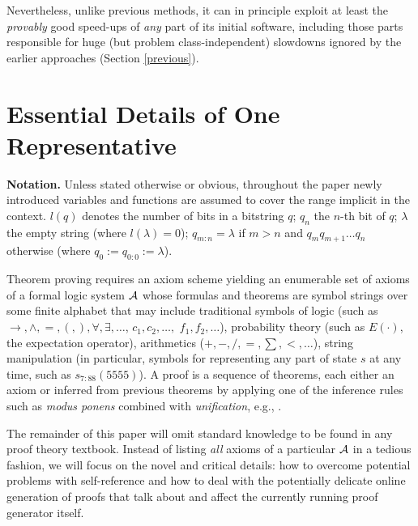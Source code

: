 Nevertheless, unlike previous methods, it can 
in principle exploit at least the {\em provably} good speed-ups 
of {\em any} part of its initial software, including those 
parts responsible for huge (but problem class-independent) slowdowns 
ignored by the earlier approaches \cite{Hutter:01aixi+,Hutter:01fast+}
(Section \ref{previous}).

\section{Essential Details of One Representative \GM}
\label{details}
{\bf Notation.} Unless stated otherwise or obvious, 
throughout the paper newly introduced variables and functions
are assumed to cover the range implicit in the context.
$l(q)$ denotes the number of bits in a bitstring $q$; 
$q_n$ the $n$-th bit of $q$;
$\lambda$ the empty string (where $l(\lambda)=0$);
$q_{m:n}= \lambda$ if $m>n$ and $q_m q_{m+1} \ldots q_n$
otherwise (where $q_0 := q_{0:0} := \lambda$).

Theorem proving requires an 
axiom scheme yielding an 
enumerable set of 
axioms of a formal logic 
system $\cal A$ whose formulas and theorems are symbol 
strings over some finite alphabet that may include traditional
symbols of logic (such as
$\rightarrow,\wedge,=,(,), \forall, \exists, \ldots$,
$c_1, c_2, \ldots,$  $f_1, f_2, \ldots$), 
probability theory (such as $E(\cdot)$, the expectation operator),
arithmetics ($+, -, /, = , \sum, <, \ldots$),
string manipulation (in particular, symbols for 
representing any part of state $s$ at any time, 
such as $s_{7:88}(5555)$).
A proof is a sequence of theorems,
each either an axiom or inferred from previous
theorems by applying one of the inference rules such
as {\em modus ponens} combined with {\em unification}, e.g.,
\cite{Fitting:96}.  

The remainder of this paper will omit standard knowledge to be found 
in any proof theory textbook.
Instead of listing {\em all} axioms of a particular $\cal A$ in
a tedious fashion,
we will focus on the novel and critical details: 
how to overcome potential problems with self-reference 
and how to deal with the potentially delicate online generation of proofs 
that talk about and affect the currently running proof generator itself. 

